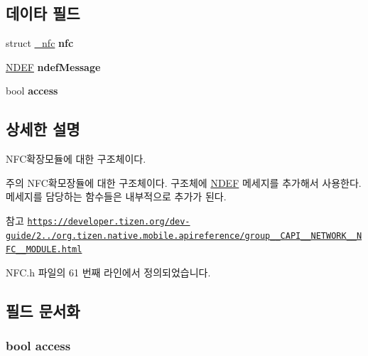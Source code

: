 \subsection*{데이타 필드}
\begin{DoxyCompactItemize}
\item 
\hypertarget{struct_n_f_c_extends_acf0441e1462c7b5253838f663761996a}{struct \hyperlink{struct__nfc}{\-\_\-nfc} {\bfseries nfc}}\label{struct_n_f_c_extends_acf0441e1462c7b5253838f663761996a}

\item 
\hypertarget{struct_n_f_c_extends_af404558710d345372ee7a9bff25f8503}{\hyperlink{struct_n_d_e_f}{N\-D\-E\-F} {\bfseries ndef\-Message}}\label{struct_n_f_c_extends_af404558710d345372ee7a9bff25f8503}

\item 
\hypertarget{struct_n_f_c_extends_ab4e2372937bb1eec89f2a954a4db6604}{bool {\bfseries access}}\label{struct_n_f_c_extends_ab4e2372937bb1eec89f2a954a4db6604}

\end{DoxyCompactItemize}


\subsection{상세한 설명}
N\-F\-C확장모듈에 대한 구조체이다. 

\begin{DoxyNote}{주의}
N\-F\-C확모장듈에 대한 구조체이다. 구조체에 \hyperlink{struct_n_d_e_f}{N\-D\-E\-F} 메세지를 추가해서 사용한다. 메세지를 담당하는 함수들은 내부적으로 추가가 된다. 
\end{DoxyNote}
\begin{DoxySeeAlso}{참고}
\href{https://developer.tizen.org/dev-guide/2.3.0/org.tizen.native.mobile.apireference/group__CAPI__NETWORK__NFC__MODULE.html}{\tt https\-://developer.\-tizen.\-org/dev-\/guide/2../org.\-tizen.\-native.\-mobile.\-apireference/group\-\_\-\-\_\-\-C\-A\-P\-I\-\_\-\-\_\-\-N\-E\-T\-W\-O\-R\-K\-\_\-\-\_\-\-N\-F\-C\-\_\-\-\_\-\-M\-O\-D\-U\-L\-E.\-html} 
\end{DoxySeeAlso}


N\-F\-C.\-h 파일의 61 번째 라인에서 정의되었습니다.



\subsection{필드 문서화}
\hypertarget{struct_n_f_c_extends_ab4e2372937bb1eec89f2a954a4db6604}{
\subsubsection[{access}]{\setlength{\rightskip}{0pt plus 5cm}bool access}}\label{struct_n_f_c_extends_ab4e2372937bb1eec89f2a954a4db6604}


